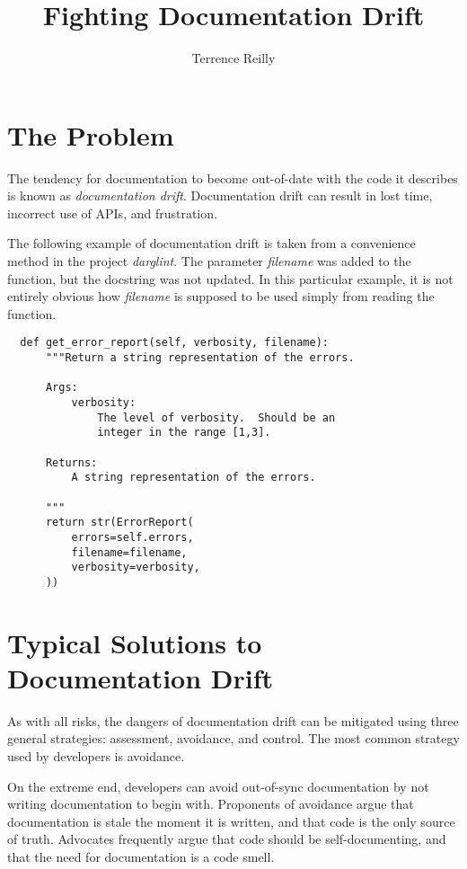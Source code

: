 \documentclass[landscape]{sciposter}
\title{\fontfamily{LinuxLibertineT-OsF}\selectfont Fighting Documentation Drift}
\author{Terrence Reilly}
\begin{document}
\maketitle
\begin{multicols}{4}

    \section{The Problem}
        The tendency for documentation to become out-of-date with
        the code it describes is known as \textit{documentation drift}.
        Documentation drift can result in lost time, incorrect use of APIs,
        and frustration.

        The following example of documentation drift is taken from
        a convenience method in the project \textit{darglint}.  The parameter
        \textit{filename} was added to the function, but the docstring
        was not updated.  In this particular example, it is not entirely
        obvious how \textit{filename} is supposed to be used simply from
        reading the function.

\begin{verbatim}
  def get_error_report(self, verbosity, filename):
      """Return a string representation of the errors.

      Args:
          verbosity:
              The level of verbosity.  Should be an
              integer in the range [1,3].

      Returns:
          A string representation of the errors.

      """
      return str(ErrorReport(
          errors=self.errors,
          filename=filename,
          verbosity=verbosity,
      ))
\end{verbatim}

    \section{Typical Solutions to Documentation Drift}
        As with all risks, the dangers of documentation drift can be
        mitigated using three general strategies: assessment, avoidance,
        and control.  The most common strategy used by developers is
        avoidance.

        On the extreme end, developers can avoid out-of-sync documentation
        by not writing documentation to begin with.  Proponents of avoidance
        argue that documentation is stale the moment it is written, and
        that code is the only source of truth.  Advocates frequently argue
        that code should be self-documenting, and that the need for
        documentation is a code smell.


\end{multicols}
\end{document}
